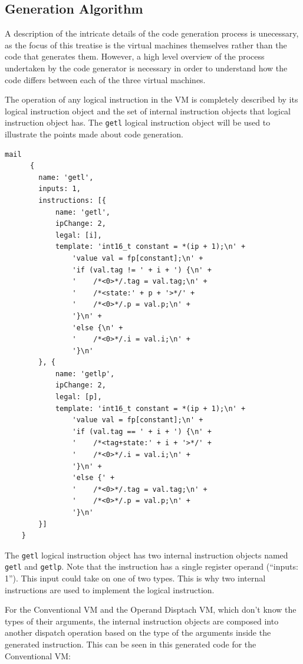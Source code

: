 \documentclass[english,a4paper,12pt]{report}
\begin{document}
\subsection{Generation Algorithm}
\label{sec:generation-algorithm}
A description of the intricate details of the code generation process
is unecessary, as the focus of this treatise is the virtual machines
themselves rather than the code that generates them. However, a high
level overview of the process undertaken by the code generator is
necessary in order to understand how the code differs between each of
the three virtual machines.

The operation of any logical instruction in the VM is completely
described by its logical instruction object and the set of internal
instruction objects that logical instruction object has. The
\verb|getl| logical instruction object will be used to illustrate the
points made about code generation.

\begin{lstlisting}mail
      {
        name: 'getl',
        inputs: 1,
        instructions: [{
            name: 'getl',
            ipChange: 2,
            legal: [i],
            template: 'int16_t constant = *(ip + 1);\n' +
                'value val = fp[constant];\n' +
                'if (val.tag != ' + i + ') {\n' +
                '    /*<0>*/.tag = val.tag;\n' +
                '    /*<state:' + p + '>*/' +
                '    /*<0>*/.p = val.p;\n' +
                '}\n' +
                'else {\n' +
                '    /*<0>*/.i = val.i;\n' +
                '}\n'
        }, {
            name: 'getlp',
            ipChange: 2,
            legal: [p],
            template: 'int16_t constant = *(ip + 1);\n' +
                'value val = fp[constant];\n' +
                'if (val.tag == ' + i + ') {\n' +
                '    /*<tag+state:' + i + '>*/' +
                '    /*<0>*/.i = val.i;\n' +
                '}\n' +
                'else {' +
                '    /*<0>*/.tag = val.tag;\n' +
                '    /*<0>*/.p = val.p;\n' +
                '}\n'
        }]
    }
\end{lstlisting}

The \verb|getl| logical instruction object has two internal
instruction objects named \verb|getl| and \verb|getlp|. Note that the
instruction has a single register operand (``inputs: 1''). This input
could take on one of two types. This is why two internal instructions
are used to implement the logical instruction.

For the Conventional VM and the Operand Disptach VM, which don't know
the types of their arguments, the internal instruction objects are
composed into another dispatch operation based on the type of the
arguments inside the generated instruction. This can be seen in this
generated code for the Conventional VM:
\end{document}
